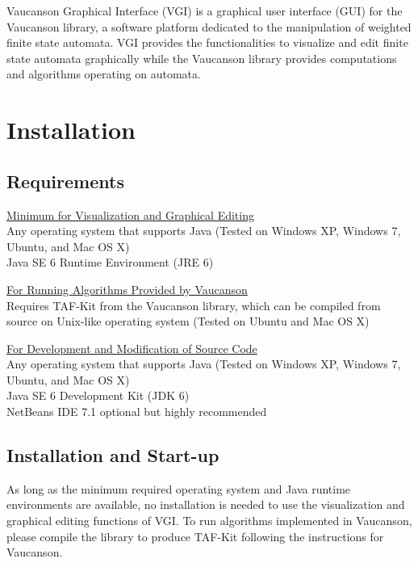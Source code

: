 Vaucanson Graphical Interface (VGI) is a graphical user interface
(GUI) for the Vaucanson library, a software platform dedicated to
the manipulation of weighted finite state automata.  VGI provides
the functionalities to visualize and edit finite state automata
graphically while the Vaucanson library provides computations and
algorithms operating on automata.

\section{Installation}

\subsection{Requirements}

\noindent
\underline{Minimum for Visualization and Graphical Editing} \\
Any operating system that supports Java (Tested on Windows XP,
Windows 7, Ubuntu, and Mac OS X) \\ Java SE 6 Runtime Environment
(JRE 6)

\noindent \underline{For Running Algorithms Provided by Vaucanson}\\
Requires TAF-Kit from the Vaucanson library, which can be compiled
from source on Unix-like operating system (Tested on Ubuntu and Mac
OS X)

\noindent \underline{For Development and Modification of Source
Code}\\ Any operating system that supports Java (Tested on Windows
XP, Windows 7, Ubuntu, and Mac OS X) \\ Java SE 6 Development Kit
(JDK 6) \\ NetBeans IDE 7.1 optional but highly recommended




\subsection{Installation and Start-up}


As long as the minimum required operating system and Java runtime
environments are available, no installation is needed to use the
visualization and graphical editing functions of VGI.  To run
algorithms implemented in Vaucanson, please compile the library to
produce TAF-Kit following the instructions for Vaucanson.

